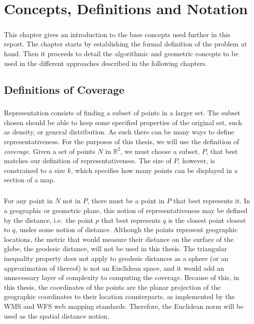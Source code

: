 \chapter{Concepts, Definitions and Notation}
\label{chap:theory}
\paragraph{}
This chapter gives an introduction to the base concepts used further in this report.
The chapter starts by establishing the formal definition of the problem at hand. 
Then it proceeds to detail the algorithmic and geometric concepts to be used in the different approaches described in the following chapters.
\section{Definitions of Coverage}
\label{sect:problem}
\paragraph{}
Representation consists of finding a subset of points in a larger set. The subset chosen should be able to keep some specified properties of the original set, such as density, or general distribution. As such there can be many ways to define representativeness. For the purposes of this thesis, we will use the definition of \emph{coverage}.
Given a set of points $N$ in $\mathbb{R}^2$, we must choose a subset, $P$, that best matches our definition of representativeness. The size of $P$, however, is constrained to a size $k$, which specifies how many points can be displayed in a section of a map.

\paragraph{}
For any point in $N$ not in $P$, there must be a point in $P$ that best represents it. In a geographic or geometric plane, this notion of representativeness may be defined by the distance, i.e.\ the point $p$ that best represents $q$ is the closest point closest to $q$, under some notion of distance. 
Although the points represent geographic locations, the metric that would measure their distance on the surface of the globe, the geodesic distance, will not be used in this thesis. The triangular inequality property does not apply to geodesic distances as a sphere (or an approximation of thereof) is not an Euclidean space, and it would add an unnecessary layer of complexity to computing the coverage.
Because of this, in this thesis, the coordinates of the points are the planar projection of the geographic coordinates to their location counterparts, as implemented by the WMS and WFS web mapping standards. Therefore, the Euclidean norm will be used as the spatial distance notion. 

